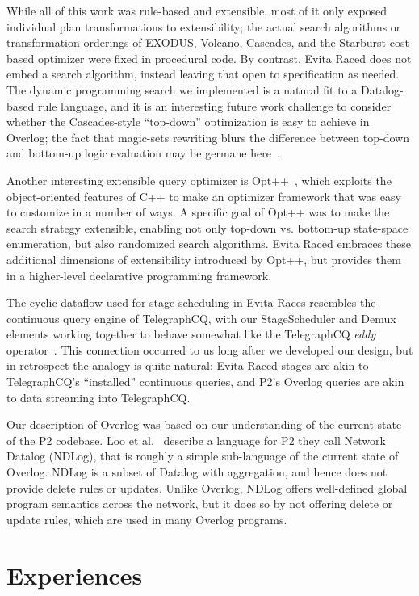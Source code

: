 While all of this work was rule-based and extensible, most of it only exposed individual plan transformations to extensibility; the actual search algorithms or transformation orderings of EXODUS, Volcano, Cascades, and the Starburst cost-based optimizer were fixed in procedural code.  By contrast, Evita Raced does not embed a search algorithm, instead leaving that open to specification as needed.  The dynamic programming search we implemented is a natural fit to a Datalog-based rule language, and it is an interesting future work challenge to consider whether the Cascades-style ``top-down'' optimization is easy to achieve in Overlog; the fact that magic-sets rewriting blurs the difference between top-down and bottom-up logic evaluation may be germane here~\cite{topdownbottomup}.

Another interesting extensible query optimizer is Opt++~\cite{kabradewitt}, which exploits the object-oriented features of C++ to make an optimizer framework that was easy to customize in a number of ways.  A specific goal of Opt++ was to make the search strategy extensible, enabling not only top-down vs. bottom-up state-space enumeration, but also randomized search algorithms.  Evita Raced embraces these additional dimensions of extensibility introduced by Opt++, but provides them in a higher-level declarative programming framework.

The cyclic dataflow used for stage scheduling in Evita Races resembles the continuous query engine of TelegraphCQ, with our StageScheduler and Demux elements working together to behave somewhat like the TelegraphCQ {\em eddy} operator~\cite{tcq-cidr}.  This connection occurred to us long after we developed our design, but in retrospect the analogy is quite natural: Evita Raced stages are akin to TelegraphCQ's ``installed'' continuous queries, and P2's Overlog queries are akin to data streaming into TelegraphCQ.

Our description of Overlog was based on our understanding of the current state of the P2 codebase.  Loo et al.~\cite{loo-sigmod06} describe a language for P2 they call Network Datalog (NDLog), that is roughly a simple sub-language of the current state of Overlog.  NDLog is a subset of Datalog with aggregation, and hence does not provide delete rules or updates.  Unlike Overlog, NDLog offers well-defined global program semantics across the network, but it does so by not offering delete or update rules, which are used in many Overlog programs.


\section{Experiences}
\label{sec:gripes}

